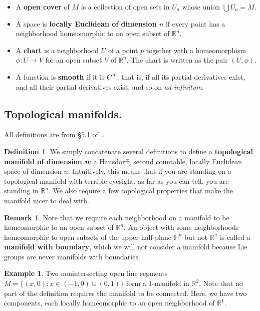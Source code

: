 \documentclass[12pt]{article}
\newcommand{\R}{\mathbb{R}}
\theoremstyle{definition}
\theoremstyle{definition}
\theoremstyle{definition}
\theoremstyle{definition}
\newtheorem{rmk}[them]{Remark}
\theoremstyle{definition}
\newtheorem{defn}[them]{Definition}
\theoremstyle{definition}
\newtheorem{ex}[them]{Example}
\theoremstyle{definition}
\theoremstyle{definition}
\begin{document}
\begin{itemize}[noitemsep,topsep=0pt]
\item {A \textbf{open cover} of $M$ is a
collection of open sets in ${U_a}$ whose union
$\bigcup U_a = M$.}

\item {A space is \textbf{locally Euclidean of
dimension $n$} if every point has a neighborhood
homeomorphic to an open subset of $\R^n$.}

\item {A \textbf{chart} is a neighborhood $U$ of a
point $p$ together with a homeomorphism $\phi: U
\to V$ for an open subset $V$ of $\R^n$. The chart
is written as the pair $(U, \phi)$.}

\item {A function is \textbf{smooth} if it is
$C^\infty$, that is, if all its partial
derivatives exist, and all their partial
derivatives exist, and so on \textit{ad
infinitum}.}
\end{itemize}

\subsection{Topological manifolds.}

\par{All definitions are from §5.1 of~\cite{Tu}.}

\begin{defn}
We simply concatenate several definitions to
define a \textbf{topological manifold of
dimension \textit{n}}: a Hausdorff, second
countable, locally Euclidean space of
dimension $n$. Intuitively, this means that if
you are standing on a topological manifold
with terrible eyesight, as far as you can
tell, you are standing in $\R^n$. We also
require a few topological properties that make
the manifold nicer to deal with.
\end{defn}

\begin{rmk}
Note that we require each neighborhood on a
manifold to be homeomorphic to an open subset
of $\R^n$. An object with some neighborhoods
homeomorphic to open subsets of the upper
half-plane $\mathbb{H}^n$
but not $\R^n$ is called a \textbf{manifold
with boundary}, which we will not consider a
manifold because Lie groups are never manifolds
with boundaries.
\end{rmk}
    
\begin{ex}
Two nonintersecting open line segments $M =
\{(x,0): x \in (-1,0) \cup (0,1)\}$ form a
$1$-manifold in $\R^2$. Note that no part of
the definition requires the manifold to be
connected. Here, we have two components, each
locally homeomorphic to an open neighborhood
of $\R^1$.
\end{ex}
\end{document}
